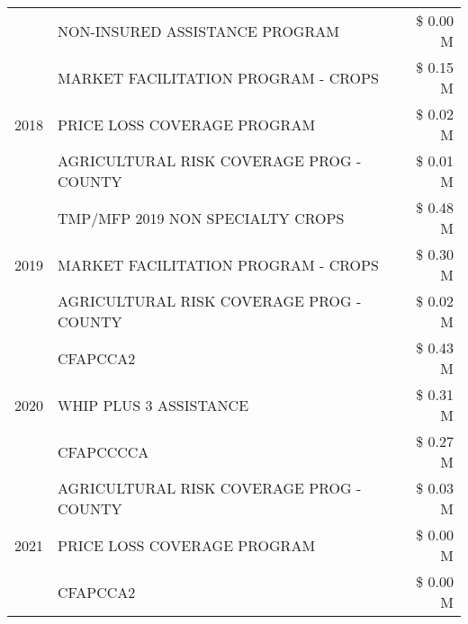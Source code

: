 \begin{tabular}{llr}
 & NON-INSURED ASSISTANCE PROGRAM & \$ 0.00 M \\
\cline{1-3}
\multirow[t]{3}{*}{2018} & MARKET FACILITATION PROGRAM - CROPS & \$ 0.15 M \\
 & PRICE LOSS COVERAGE PROGRAM & \$ 0.02 M \\
 & AGRICULTURAL RISK COVERAGE PROG - COUNTY & \$ 0.01 M \\
\cline{1-3}
\multirow[t]{3}{*}{2019} & TMP/MFP 2019 NON SPECIALTY CROPS & \$ 0.48 M \\
 & MARKET FACILITATION PROGRAM - CROPS & \$ 0.30 M \\
 & AGRICULTURAL RISK COVERAGE PROG - COUNTY & \$ 0.02 M \\
\cline{1-3}
\multirow[t]{3}{*}{2020} & CFAPCCA2 & \$ 0.43 M \\
 & WHIP PLUS 3 ASSISTANCE & \$ 0.31 M \\
 & CFAPCCCCA & \$ 0.27 M \\
\cline{1-3}
\multirow[t]{3}{*}{2021} & AGRICULTURAL RISK COVERAGE PROG - COUNTY & \$ 0.03 M \\
 & PRICE LOSS COVERAGE PROGRAM & \$ 0.00 M \\
 & CFAPCCA2 & \$ 0.00 M \\
\cline{1-3}
\bottomrule
\end{tabular}

